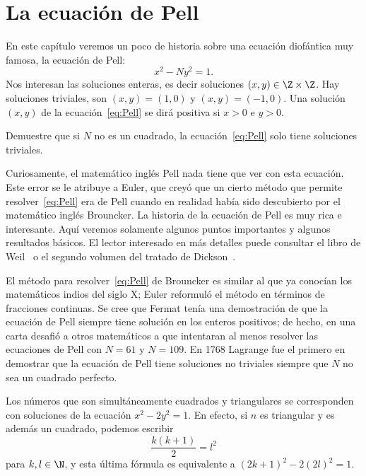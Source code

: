\chapter{La ecuación de Pell}

En este capítulo veremos un poco de historia sobre una ecuación diofántica muy
famosa, la ecuación de Pell:
\begin{equation}
	\label{eq:Pell}
	x^2-Ny^2=1.
\end{equation}
Nos interesan las soluciones enteras, es decir soluciones $(x,y)\in\Z\times\Z$.
Hay soluciones triviales, son $(x,y)=(1,0)$ y $(x,y)=(-1,0)$. Una solución
$(x,y)$ de la ecuación~\eqref{eq:Pell} se dirá positiva si $x>0$ e $y>0$. 

\begin{exercise}
	Demuestre que si $N$ no es un cuadrado, la ecuación~\eqref{eq:Pell} solo
	tiene soluciones triviales.
\end{exercise}

Curiosamente, el matemático inglés Pell nada tiene que ver con esta ecuación.
Este error se le atribuye a Euler, que creyó que un cierto método que permite
resolver~\eqref{eq:Pell} era de Pell cuando en realidad había sido descubierto
por el matemático inglés Brouncker.  La historia de la ecuación de Pell es muy
rica e interesante. Aquí veremos solamente algunos puntos importantes y algunos
resultados básicos. El lector interesado en más detalles puede consultar el
libro de Weil~\cite{MR734177} o el segundo volumen del tratado de
Dickson~\cite{MR0245500}.

El método para resolver~\eqref{eq:Pell} de Brouncker es similar 
al que ya conocían los matemáticos indios del siglo X; Euler reformuló el
método en términos de fracciones continuas.  Se cree que Fermat tenía una
demostración de que la ecuación de Pell siempre tiene solución en los enteros
positivos; de hecho, en una carta desafió a otros matemáticos a que intentaran
al menos resolver las ecuaciones de Pell con $N=61$ y $N=109$.  En 1768
Lagrange fue el primero en demostrar que la ecuación de Pell tiene soluciones
no triviales siempre que $N$ no sea un cuadrado perfecto. 

\begin{example}
	Los números que son simultáneamente cuadrados y triangulares se
	corresponden con soluciones de la ecuación $x^2-2y^2=1$. En efecto, si $n$
	es triangular y es además un cuadrado, podemos escribir 
	\[
		\frac{k(k+1)}{2}=l^2
	\]
	para $k,l\in\N$, y esta última fórmula es equivalente a
	$(2k+1)^2-2(2l)^2=1$.
\end{example}

